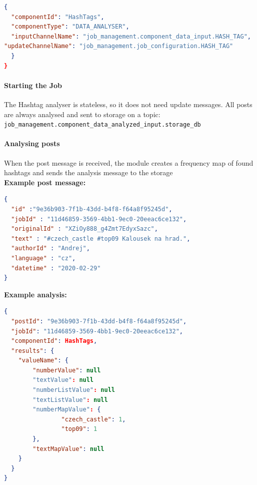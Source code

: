 \begin{lstlisting}[language=json,firstnumber=1]
{
  "componentId": "HashTags",
  "componentType": "DATA_ANALYSER",
  "inputChannelName": "job_management.component_data_input.HASH_TAG",
"updateChannelName": "job_management.job_configuration.HASH_TAG"
  }
}
\end{lstlisting}

\paragraph{Starting the Job}

The Hashtag analyser is stateless, so it does not need update messages. All posts are always analysed and sent to storage on a topic:\\ \texttt{job\_management.component\_data\_analyzed\_input.storage\_db}\\

\paragraph{Analysing posts}

When the post message is received, the module creates a frequency map of found hashtags and sends the analysis message to the storage
\\

\noindent
\textbf{Example post message:}


\begin{lstlisting}[language=json,firstnumber=1]
{
  "id" :"9e36b903-7f1b-43dd-b4f8-f64a8f95245d",
  "jobId" : "11d46859-3569-4bb1-9ec0-20eeac6ce132",
  "originalId" : "XZiOy888_g4Zmt7EdyxSazc",
  "text" : "#czech_castle #top09 Kalousek na hrad.",
  "authorId" : "Andrej",
  "language" : "cz",
  "datetime" : "2020-02-29"
}
\end{lstlisting}

\noindent
\textbf{Example analysis:}

\begin{lstlisting}[language=json,firstnumber=1]
{
  "postId": "9e36b903-7f1b-43dd-b4f8-f64a8f95245d",
  "jobId": "11d46859-3569-4bb1-9ec0-20eeac6ce132",
  "componentId": HashTags,
  "results": {
    "valueName": {
        "numberValue": null
        "textValue": null
        "numberListValue": null
        "textListValue": null
        "numberMapValue": {
                "czech_castle": 1,
                "top09": 1
        },
        "textMapValue": null
    }
  }
}
\end{lstlisting}
       
